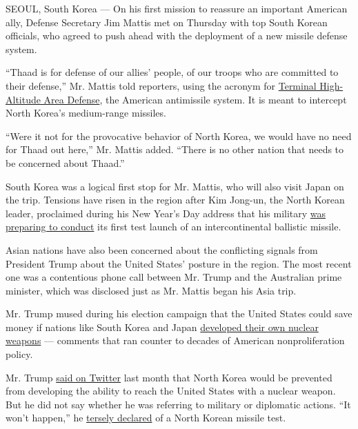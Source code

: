 SEOUL, South Korea --- On his first mission to reassure an important
American ally, Defense Secretary Jim Mattis met on Thursday with top
South Korean officials, who agreed to push ahead with the deployment of
a new missile defense system.

``Thaad is for defense of our allies' people, of our troops who are
committed to their defense,'' Mr. Mattis told reporters, using the
acronym for \href{https://www.mda.mil/system/thaad.html}{Terminal
High-Altitude Area Defense}, the American antimissile system. It is
meant to intercept North Korea's medium-range missiles.

``Were it not for the provocative behavior of North Korea, we would have
no need for Thaad out here,'' Mr. Mattis added. ``There is no other
nation that needs to be concerned about Thaad.''

South Korea was a logical first stop for Mr. Mattis, who will also visit
Japan on the trip. Tensions have risen in the region after Kim Jong-un,
the North Korean leader, proclaimed during his New Year's Day address
that his military
\href{https://www.nytimes3xbfgragh.onion/2017/01/01/world/asia/north-korea-intercontinental-ballistic-missile-test-kim-jong-un.html}{was
preparing to conduct} its first test launch of an intercontinental
ballistic missile.

Asian nations have also been concerned about the conflicting signals
from President Trump about the United States' posture in the region. The
most recent one was a contentious phone call between Mr. Trump and the
Australian prime minister, which was disclosed just as Mr. Mattis began
his Asia trip.

Mr. Trump mused during his election campaign that the United States
could save money if nations like South Korea and Japan
\href{http://cnnpressroom.blogs.cnn.com/2016/03/29/full-rush-transcript-donald-trump-cnn-milwaukee-republican-presidential-town-hall/}{developed
their own nuclear weapons} --- comments that ran counter to decades of
American nonproliferation policy.

Mr. Trump
\href{https://twitter.com/realDonaldTrump/status/816057920223846400}{said
on Twitter} last month that North Korea would be prevented from
developing the ability to reach the United States with a nuclear weapon.
But he did not say whether he was referring to military or diplomatic
actions. ``It won't happen,'' he
\href{https://www.nytimes3xbfgragh.onion/2017/01/02/world/asia/trump-twitter-north-korea-missiles-china.html}{tersely
declared} of a North Korean missile test.

